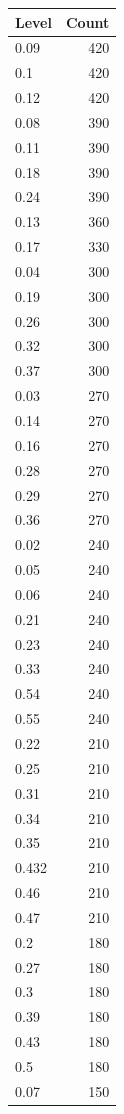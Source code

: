 \begin{table}[ht]
\centering
\begin{tabular}{lr}
  \hline
Level & Count \\ 
  \hline
0.09 & 420 \\ 
  0.1 & 420 \\ 
  0.12 & 420 \\ 
  0.08 & 390 \\ 
  0.11 & 390 \\ 
  0.18 & 390 \\ 
  0.24 & 390 \\ 
  0.13 & 360 \\ 
  0.17 & 330 \\ 
  0.04 & 300 \\ 
  0.19 & 300 \\ 
  0.26 & 300 \\ 
  0.32 & 300 \\ 
  0.37 & 300 \\ 
  0.03 & 270 \\ 
  0.14 & 270 \\ 
  0.16 & 270 \\ 
  0.28 & 270 \\ 
  0.29 & 270 \\ 
  0.36 & 270 \\ 
  0.02 & 240 \\ 
  0.05 & 240 \\ 
  0.06 & 240 \\ 
  0.21 & 240 \\ 
  0.23 & 240 \\ 
  0.33 & 240 \\ 
  0.54 & 240 \\ 
  0.55 & 240 \\ 
  0.22 & 210 \\ 
  0.25 & 210 \\ 
  0.31 & 210 \\ 
  0.34 & 210 \\ 
  0.35 & 210 \\ 
  0.432 & 210 \\ 
  0.46 & 210 \\ 
  0.47 & 210 \\ 
  0.2 & 180 \\ 
  0.27 & 180 \\ 
  0.3 & 180 \\ 
  0.39 & 180 \\ 
  0.43 & 180 \\ 
  0.5 & 180 \\ 
  0.07 & 150 \\ 

\end{tabular}
\end{table}
